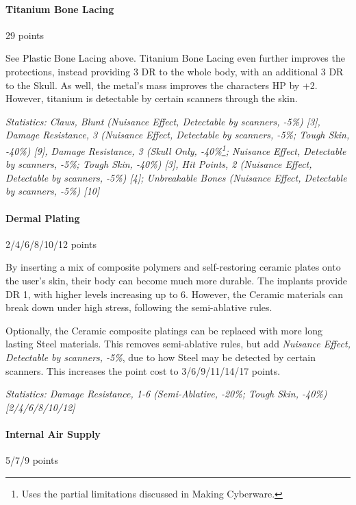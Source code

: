 \begin{multicols*}{3}
	\paragraph{Titanium Bone Lacing}
	\begin{flushright}
		29 points
	\end{flushright}
	
	See Plastic Bone Lacing above. Titanium Bone Lacing even further improves the protections, instead providing 3 DR to the whole body, with an additional 3 DR to the Skull. As well, the metal's mass improves the characters HP by +2. However, titanium is detectable by certain scanners through the skin.
	
	\textit{\textcolor{OliveGreen}{Statistics: Claws, Blunt (Nuisance Effect, Detectable by scanners,  -5\%) [3], Damage Resistance, 3 (Nuisance Effect, Detectable by scanners, -5\%; Tough Skin, -40\%) [9], Damage Resistance, 3 (Skull Only, -40\%\footnote {Uses the partial limitations discussed in Making Cyberware.}; Nuisance Effect, Detectable by scanners, -5\%; Tough Skin, -40\%) [3], Hit Points, 2 (Nuisance Effect, Detectable by scanners,  -5\%) [4]; Unbreakable Bones (Nuisance Effect, Detectable by scanners,  -5\%) [10]}}
	
	\paragraph{Dermal Plating}
	\begin{flushright}
		2/4/6/8/10/12 points
	\end{flushright}
	
	By inserting a mix of composite polymers and self-restoring ceramic plates onto the user's skin, their body can become much more durable. The implants provide DR 1, with higher levels increasing up to 6. However, the Ceramic materials can break down under high stress, following the semi-ablative rules.
	
	Optionally, the Ceramic composite platings can be replaced with more long lasting Steel materials. This removes semi-ablative rules, but add \textit{Nuisance Effect, Detectable by scanners, -5\%}, due to how Steel may be detected by certain scanners. This increases the point cost to 3/6/9/11/14/17 points.
	
	\textit{\textcolor{OliveGreen}{Statistics: Damage Resistance, 1-6 (Semi-Ablative, -20\%; Tough Skin, -40\%) [2/4/6/8/10/12]}}
	
	\paragraph{Internal Air Supply}
	\begin{flushright}
		5/7/9 points
	\end{flushright}
	

\end{multicols*}
